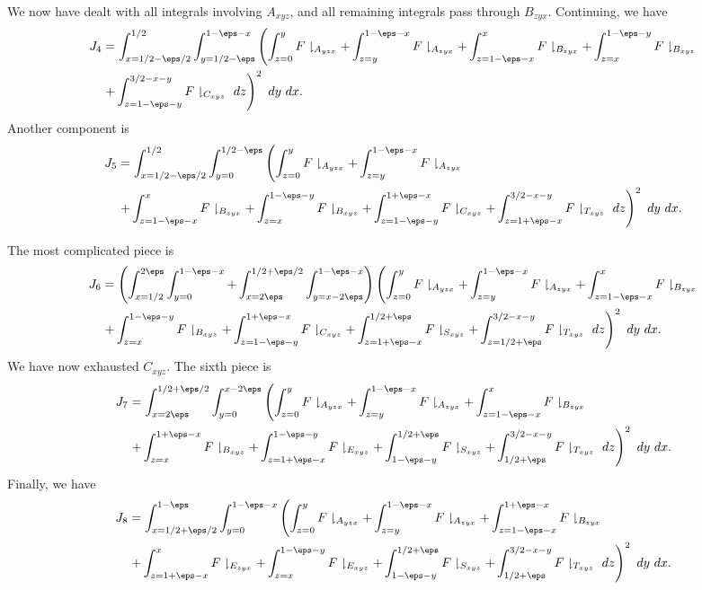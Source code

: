 We now have dealt with all integrals involving $A_{xyz}$, and all remaining integrals pass through $B_{zyx}$.  Continuing, we have
\begin{align*}
J_4 & =\int_{x=1/2-\eps/2}^{1/2}\int_{y=1/2-\eps}^{1-\eps-x} \left(\int_{z=0}^{y}F\downharpoonright_{A_{yzx}}+\int_{z=y}^{1-\eps-x}F\downharpoonright_{A_{zyx}} +\int_{z=1-\eps-x}^{x}F\downharpoonright_{B_{zyx}} +\int_{z=x}^{1-\eps-y}F\downharpoonright_{B_{xyz}}\right. \\ & \left. +\int_{z=1-\eps-y}^{3/2-x-y}F\downharpoonright_{C_{xyz}}\ dz \right)^{2}\ dy\ dx.
\end{align*}
Another component is
\begin{align*}
J_5 & = \int_{x=1/2-\eps/2}^{1/2}\int_{y=0}^{1/2-\eps} \left(\int_{z=0}^{y}F\downharpoonright_{A_{yzx}}+\int_{z=y}^{1-\eps-x}F\downharpoonright_{A_{zyx}} \right. \\ & \left. +\int_{z=1-\eps-x}^{x}F\downharpoonright_{B_{zyx}} +\int_{z=x}^{1-\eps-y}F\downharpoonright_{B_{xyz}} +\int_{z=1-\eps-y}^{1+\eps-x}F\downharpoonright_{C_{xyz}} + \int_{z=1+\eps-x}^{3/2-x-y}F\downharpoonright_{T_{xyz}}\ dz \right)^{2}\ dy\ dx.
\end{align*}

The most complicated piece is
\begin{align*}
J_6 & =\left(\int_{x=1/2}^{2\eps} \int_{y=0}^{1-\eps-x} + \int_{x=2\eps}^{1/2+\eps/2}\int_{y=x-2\eps}^{1-\eps-x} \right) \left(\int_{z=0}^{y}F\downharpoonright_{A_{yzx}}+\int_{z=y}^{1-\eps-x}F\downharpoonright_{A_{zyx}} +\int_{z=1-\eps-x}^{x}F\downharpoonright_{B_{zyx}}  \right. \\ & \left. +\int_{z=x}^{1-\eps-y}F\downharpoonright_{B_{xyz}} +\int_{z=1-\eps-y}^{1+\eps-x}F\downharpoonright_{C_{xyz}} + \int_{z=1+\eps-x}^{1/2+\eps}F\downharpoonright_{S_{xyz}}+ \int_{z=1/2+\eps}^{3/2-x-y}F\downharpoonright_{T_{xyz}}\ dz \right)^{2}\ dy\ dx.
\end{align*}
We have now exhausted $C_{xyz}$.  The sixth piece is
\begin{align*}
J_7 & = \int_{x=2\eps}^{1/2+\eps/2}\int_{y=0}^{x-2\eps} \left(\int_{z=0}^{y}F\downharpoonright_{A_{yzx}}+\int_{z=y}^{1-\eps-x}F\downharpoonright_{A_{zyx}} +\int_{z=1-\eps-x}^{x}F\downharpoonright_{B_{zyx}} \right. \\ & \left. +\int_{z=x}^{1+\eps-x}F\downharpoonright_{B_{xyz}} + \int_{z=1+\eps-x}^{1-\eps-y}F\downharpoonright_{E_{xyz}} + \int_{1-\eps-y}^{1/2+\eps}F\downharpoonright_{S_{xyz}}+ \int_{1/2+\eps}^{3/2-x-y}F\downharpoonright_{T_{xyz}} \ dz \right)^{2}\ dy\ dx.
\end{align*}
Finally, we have
\begin{align*}
J_8 & = \int_{x=1/2+\eps/2}^{1-\eps}\int_{y=0}^{1-\eps-x} \left(\int_{z=0}^{y}F\downharpoonright_{A_{yzx}}+\int_{z=y}^{1-\eps-x}F\downharpoonright_{A_{zyx}} +\int_{z=1-\eps-x}^{1+\eps-x}F\downharpoonright_{B_{zyx}} \right. \\ & \left. + \int_{z=1+\eps-x}^{x}F\downharpoonright_{E_{zyx}} + \int_{z=x}^{1-\eps-y}F\downharpoonright_{E_{xyz}} + \int_{1-\eps-y}^{1/2+\eps}F\downharpoonright_{S_{xyz}}+ \int_{1/2+\eps}^{3/2-x-y}F\downharpoonright_{T_{xyz}}\ dz \right)^{2}\ dy\ dx.
\end{align*}


